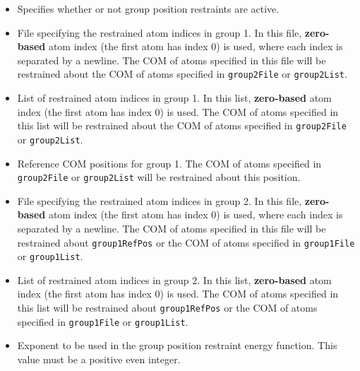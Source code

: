 \begin{itemize}

\item
{}
{Specifies whether or not group position restraints are active.}

\item
{}
{File specifying the restrained atom indices in group 1. In this file, 
{\bf zero-based} atom index (the first atom has index 0) is used, 
where each index is separated by a newline. The COM of atoms specified in 
this file will be restrained about the COM of atoms specified in 
{\tt group2File} or {\tt group2List}.}

\item
{}
{List of restrained atom indices in group 1. In this list, 
{\bf zero-based} atom index (the first atom has index 0) is used.
The COM of atoms specified in this list will be restrained about 
the COM of atoms specified in {\tt group2File} or {\tt group2List}.}

\item
{}
{Reference COM positions for group 1.
The COM of atoms specified in {\tt group2File} or {\tt group2List} 
will be restrained about this position.}

\item
{}
{File specifying the restrained atom indices in group 2. In this file, 
{\bf zero-based} atom index (the first atom has index 0) is used, 
where each index is separated by a newline. The COM of atoms specified in 
this file will be restrained about {\tt group1RefPos} or the COM of atoms 
specified in {\tt group1File} or {\tt group1List}.}

\item
{}
{List of restrained atom indices in group 2. In this list, 
{\bf zero-based} atom index (the first atom has index 0) is used.
The COM of atoms specified in this list will be restrained about 
{\tt group1RefPos} or the COM of atoms specified in {\tt group1File} or 
{\tt group1List}.}

\item
{}
{Exponent to be used in the group position restraint energy function.
This value must be a positive even integer.}


\end{itemize}
